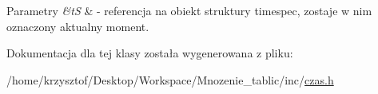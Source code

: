 \begin{DoxyParams}{\-Parametry}
{\em \&t\-S} & -\/ referencja na obiekt struktury timespec, zostaje w nim oznaczony aktualny moment. \\
\hline
\end{DoxyParams}


\-Dokumentacja dla tej klasy została wygenerowana z pliku\-:\begin{DoxyCompactItemize}
\item 
/home/krzysztof/\-Desktop/\-Workspace/\-Mnozenie\-\_\-tablic/inc/\hyperlink{czas_8h}{czas.\-h}\end{DoxyCompactItemize}
